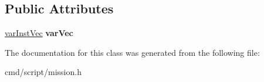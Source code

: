 \subsection*{Public Attributes}
\begin{DoxyCompactItemize}
\item 
\hyperlink{classvarInstVec}{var\+Inst\+Vec} {\bfseries var\+Vec}\hypertarget{classvarInstMap_af44a160d127a7b63ccceea37f619685c}{}\label{classvarInstMap_af44a160d127a7b63ccceea37f619685c}

\end{DoxyCompactItemize}


The documentation for this class was generated from the following file\+:\begin{DoxyCompactItemize}
\item 
cmd/script/mission.\+h\end{DoxyCompactItemize}
